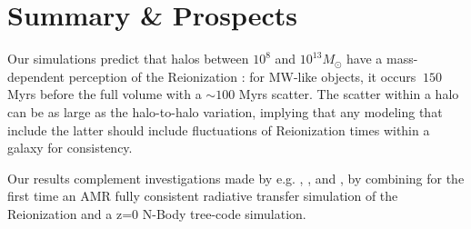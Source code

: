 \documentclass[twocolumn]{aastex61}
\begin{document}
 \section{Summary \& Prospects}
Our simulations predict that halos between $10^{8}$ and $10^{13} M_\odot $ have a mass-dependent perception of the Reionization : for MW-like objects, it occurs $~150$ Myrs before the full volume with a $\sim 100$ Myrs scatter. The scatter within a halo can be as large as the halo-to-halo variation, implying that any modeling that include the latter should include fluctuations of Reionization times within a galaxy for consistency.
 
Our results complement investigations made by e.g. \citet{WEI07}, \citet{ALV9}, \citet{LI14} and \citet{OCV14}, by combining for the first time an AMR fully consistent radiative transfer simulation of the Reionization and a z=0 N-Body tree-code simulation. 


\end{document}
